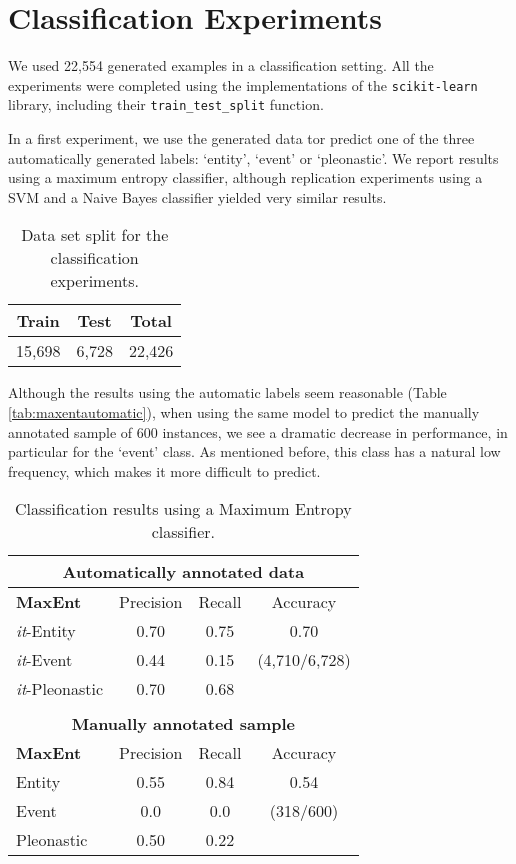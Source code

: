 \documentclass[10pt, a4paper]{article}
\begin{document}
\section{Classification Experiments}

We used 22,554 generated examples in a classification setting. All the experiments were completed using the implementations of the \texttt{scikit-learn} library, including their \texttt{train\_test\_split} function. 

In a first experiment, we use the generated data tor predict one of the three automatically generated labels: `entity', `event' or `pleonastic'. We report results using a maximum entropy classifier, although replication experiments using a SVM and a Naive Bayes classifier yielded very similar results. 


\begin{table}[h!]\centering
\begin{tabular}{ccc}
\toprule
\textbf{Train} & \textbf{Test} & \textbf{Total} \\
\midrule
15,698 & 6,728 & 22,426 \\
\bottomrule
\end{tabular}
\caption{Data set split for the classification experiments. }
\end{table}

 Although the results using the automatic labels seem reasonable (Table  \ref{tab:maxentautomatic}), when using the same model to predict the manually annotated sample of 600 instances, we see a dramatic decrease in performance, in particular for the `event' class. As mentioned before, this class has a natural low frequency, which makes it more difficult to predict. 

\begin{center} \begin{table}[h!]\centering 
\begin{tabular}{l ccc}
\multicolumn{4}{c}{ \textbf{Automatically annotated data}}\\ 
\toprule
\textbf{MaxEnt}& Precision & Recall & Accuracy \\ 
\midrule 
\textit{it}-Entity &0.70 & 0.75 &   0.70\\
\textit{it}-Event & 0.44 & 0.15 & (4,710/6,728) \\
\textit{it}-Pleonastic & 0.70 & 0.68&   \\ 
\midrule & & & \\
\multicolumn{4}{c}{\textbf{Manually annotated sample}}  \\ 
\midrule
\textbf{MaxEnt}& Precision & Recall & Accuracy \\ 
\midrule 
Entity &0.55 & 0.84 &0.54\\ 
Event &0.0 & 0.0 & (318/600)\\ 
Pleonastic & 0.50 & 0.22 & \\ 
\bottomrule
\end{tabular} \caption{Classification results using a Maximum Entropy
classifier.} 
\end{table}\label{tab:maxentautomatic}
\end{center}
\end{document}
